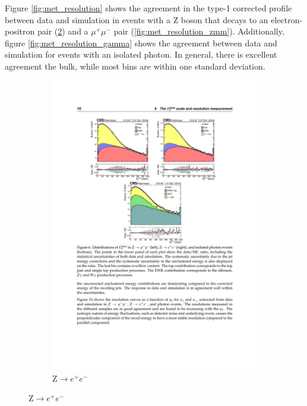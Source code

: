       Figure \ref{fig:met_resolution} shows the agreement in the type-1 corrected \MET profile between data and simulation in events with a Z boson that decays to an electron-positron pair (\ref{fig:met_resolution_zee}) and a $\mu^+ \mu^-$ pair (\ref{fig:met_resolution_zmm}). Additionally, figure \ref{fig:met_resolution_gamma} shows the agreement between data and simulation for events with an isolated photon. In general, there is excellent agreement the bulk, while most bins are within one standard deviation.

      \begin{figure}[!htb]
        \centering
        \begin{subfigure}[t]{0.31\textwidth}
          \includegraphics[width=\textwidth]{figures/met_resolution_zee.pdf}
          \caption{Z$\to e^+ e^-$}
          \label{fig:met_resolution_zee}
        \end{subfigure}

\end{figure}
